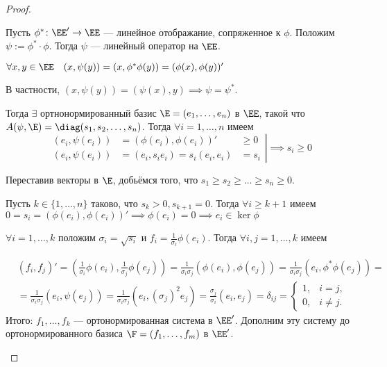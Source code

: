 \documentclass[a4paper]{article}
\begin{document}
\begin{colloq}
\begin{proof}
\begin{description}
                    Пусть $\phi^{*} \colon \EE' \to \EE$ --- линейное отображание, сопряженное к $\phi$. Положим $\psi := \phi^{*} \cdot \phi$. Тогда $\psi$ --- линейный оператор на $\EE$.

                    $\forall x, y \in \EE \quad (x, \psi(y)) = (x, \phi^{*} \phi(y)) = (\phi(x), \phi(y))'$

                    В частности, $(x, \psi(y)) = (\psi(x), y) \implies \psi = \psi^{*}.$
                
                    Тогда $\exists$ ортнонормированный базис $\E = (e_1, \dots, e_n)$ в $\EE$, такой что $A(\psi, \E) = \diag(s_1, s_2, \dots, s_n)$. Тогда $\forall i = 1, \dots, n$ имеем
                    \begin{equation*}
                        \left.
                            \begin{aligned}
                            (e_i,\psi(e_i)) &= (\phi(e_i),\phi(e_i))' &\geq 0 \\
                            (e_i,\psi(e_i)) &= (e_i, s_i e_i) = s_i(e_i,e_i) &= s_i
                            \end{aligned}
                        \right|
                            \implies s_i \geq 0
                    \end{equation*}

                    Переставив векторы в $\E$, добьёмся того, что $s_1 \geq s_2 \geq \dots \geq s_n \geq 0.$

                    Пусть $k \in \{1, \dots, n\}$ таково, что $s_k > 0, s_{k+1} = 0$. Тогда $\forall i \geq k+1$ имеем $0 = s_i = (\phi(e_i), \phi(e_i))' \implies \phi(e_i) = 0 \implies e_i \in \ker \phi$
                    
                    $\forall i = 1, \dots, k$ положим $\sigma_i = \sqrt{s_i}$ и $f_i = \frac{1}{\sigma_i} \phi(e_i)$. Тогда $\forall i, j = 1, \dots, k$ имеем

                    \begin{align*}
                        &(f_i, f_j)' = (\frac{1}{\sigma_i} \phi(e_i), \frac{1}{\sigma_j} \phi(e_j)) = \frac{1}{\sigma_i \sigma_j} (\phi(e_i), \phi(e_j)) =  \frac{1}{\sigma_i \sigma_j} (e_i, \phi^{*} \phi (e_j)) = \\
                        &=  \frac{1}{\sigma_i \sigma_j} (e_i, \psi(e_j)) =  \frac{1}{\sigma_i \sigma_j} (e_i, (\sigma_j)^2 e_j ) =  \frac{\sigma_j}{\sigma_i} (e_i, e_j) = \delta_{i j} =
                        \begin{cases}
                            1, &i = j, \\
                            0, &i \neq j.
                        \end{cases}
                    \end{align*}
                    Итого: $f_1, \dots, f_k$ --- ортонормированная система в $\EE'$. Дополним эту систему до ортонормированного базиса $\F = (f_1, \dots, f_m)$ в $\EE'$.


\end{description}
\end{proof}
\end{colloq}
\end{document}
